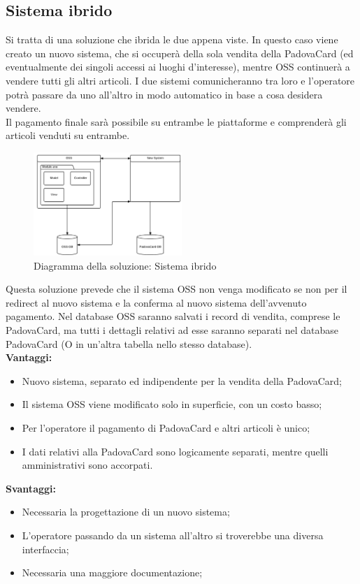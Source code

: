 \subsection{Sistema ibrido}
Si tratta di una soluzione che ibrida le due appena viste. In questo caso viene creato un nuovo sistema, che si occuperà della sola vendita della PadovaCard (ed eventualmente dei singoli accessi ai luoghi d'interesse), mentre OSS continuerà a vendere tutti gli altri articoli. 
I due sistemi comunicheranno tra loro e l'operatore potrà passare da uno all'altro in modo automatico in base a cosa desidera vendere. \\

Il pagamento finale sarà possibile su entrambe le piattaforme e comprenderà gli articoli venduti su entrambe.

\begin{figure}[H]
\centering
\includegraphics[width=0.5\textwidth]{images/Sistema_ibrido.png}
\caption{Diagramma della soluzione: Sistema ibrido}
\end{figure}
Questa soluzione prevede che il sistema OSS non venga modificato se non per il redirect al nuovo sistema e la conferma al nuovo sistema dell'avvenuto pagamento. 
Nel database OSS saranno salvati i record di vendita, comprese le PadovaCard, ma tutti i dettagli relativi ad esse saranno separati nel database PadovaCard (O in un'altra tabella nello stesso database). \\
\textbf{Vantaggi:}
\begin{itemize}
\item Nuovo sistema, separato ed indipendente per la vendita della PadovaCard;
\item Il sistema OSS viene modificato solo in superficie, con un costo basso;
\item Per l'operatore il pagamento di PadovaCard e altri articoli è unico;
\item I dati relativi alla PadovaCard sono logicamente separati, mentre quelli amministrativi sono accorpati.
\end{itemize}
\textbf{Svantaggi:}
\begin{itemize}
\item Necessaria la progettazione di un nuovo sistema;
\item L'operatore passando da un sistema all'altro si troverebbe una diversa interfaccia;
\item Necessaria una maggiore documentazione;
\end{itemize}

